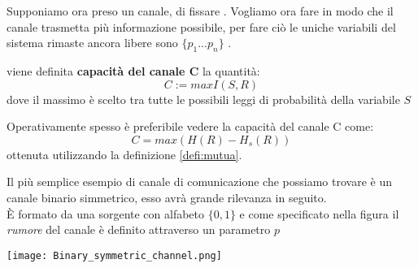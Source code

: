 Supponiamo ora preso un canale, di fissare \lepc . Vogliamo ora fare in modo che il canale trasmetta più informazione possibile, per fare ciò le uniche variabili del sistema rimaste ancora libere sono $\{p_1...p_n \}$ .
\begin{defi}
viene definita \textbf{capacità del canale C} la quantità:
\begin{equation}
C:=max I(S,R)
\end{equation}
dove il massimo è scelto tra tutte le possibili leggi di probabilità della variabile $S$
\end{defi}
Operativamente spesso è preferibile vedere la capacità del canale C come:
\begin{equation}
C=max(H(R)-H_s(R))
\end{equation}
ottenuta utilizzando la definizione \ref{defi:mutua}.\\
\begin{oss} \label{oss:bsc}
Il più semplice esempio di canale di comunicazione che possiamo trovare è un canale binario simmetrico, esso avrà grande rilevanza in seguito.\\
È formato da una sorgente  con alfabeto $\{ 0 , 1 \}$ e come specificato nella figura il \textit{rumore} del canale è definito attraverso un parametro $p$


\texttt{[image: Binary\_symmetric\_channel.png]}

\end{oss}
